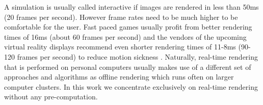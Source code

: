 \documentclass[thesis.tex]{subfiles}
\begin{document}
A simulation is usually called interactive if images are rendered in less than 50ms (20 frames per second).
However frame rates need to be much higher to be comfortable for the user.
Fast paced games usually profit from better rendering times of 16ms (about 60 frames per second) \cite{bib:shooterfps} and the vendors of the upcoming virtual reality displays recommend even shorter rendering times of 11-8ms (90-120 frames per second) to reduce motion sickness \cite{bib:oculushighfps} .
Naturally, real-time rendering that is performed on personal computers usually makes use of a different set of approaches and algorithms as offline rendering which runs often on larger computer clusters.
In this work we concentrate exclusively on real-time rendering without any pre-computation.
\end{document}
